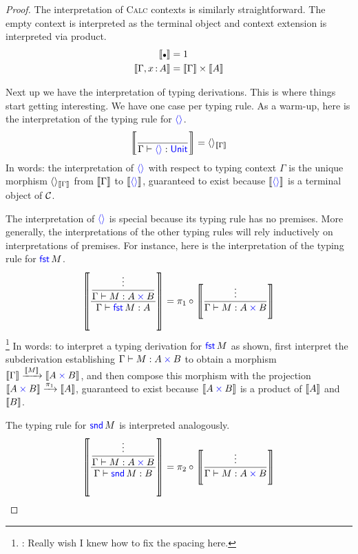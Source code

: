 \begin{proof}
  The interpretation of \textsc{Calc} contexts is similarly straightforward.
  The empty context is interpreted as the terminal object
  and context extension is interpreted via product.
  \begin{align}
    \llbr{\ctxemp} &= 1 \\
    \llbr{\Gamma, x\ofty A} &= \llbr{\Gamma} \times \llbr{A}
  \end{align}

  Next up we have the interpretation of typing derivations.
  This is where things start getting interesting.
  We have one case per typing rule. As a warm-up,
  here is the interpretation of the typing rule for \({{\color{blue}\langle \rangle}}\).
  \begin{align}
    \left\llbracket 
      \frac
        {~}
        {\Gamma \vdash {{\color{blue}\langle \rangle}} : \mathsf{{\color{blue}Unit}}}
    \right\rrbracket
    = \langle \rangle_{\left\llbracket \Gamma\right\rrbracket}
  \end{align}
  In words: the interpretation of \({{\color{blue}\langle \rangle}}\)
  with respect to typing context \(\Gamma\)
  is the unique morphism \(\langle \rangle_{\left\llbracket \Gamma\right\rrbracket}\)
  from \(\left\llbracket \Gamma\right\rrbracket\) to \(\left\llbracket {{\color{blue}\langle \rangle}}\right\rrbracket\),
  guaranteed to exist because \(\left\llbracket {{\color{blue}\langle \rangle}}\right\rrbracket\)
  is a terminal object of \(\mathcal C\).

  The interpretation of \({{\color{blue}\langle \rangle}}\) is special because its typing rule has no premises.
  More generally, the interpretations of the other typing rules
  will rely inductively on interpretations of premises.
  For instance, here is the interpretation of the typing rule for \(\mathsf{{\color{blue}fst}}\,M\).
  \begin{align}
    \left\llbracket 
      \dfrac
        {\displaystyle\frac{\vdots}{{{{\Gamma \vdash M : A \mathbin{{\color{blue}\times}} B}}}}}
        {\Gamma \vdash \mathsf{{\color{blue}fst}}\,M : A}
    \right\rrbracket
    = \pi_1 \circ \left\llbracket \frac{\vdots}{\Gamma \vdash M : A \mathbin{{\color{blue}\times}} B}\right\rrbracket
  \end{align}
  \footnote{\todo: Really wish I knew how to fix the spacing here.}
  In words: to interpret a typing derivation for \(\mathsf{{\color{blue}fst}}\,M\)
  as shown, first interpret the subderivation
  establishing \(\Gamma \vdash M : A \mathbin{{\color{blue}\times}} B\)
  to obtain a morphism \(\left\llbracket \Gamma\right\rrbracket \xrightarrow{\left\llbracket M\right\rrbracket} \left\llbracket A\mathbin{{\color{blue}\times}} B\right\rrbracket\),
  and then compose this morphism with the projection
  \(\left\llbracket A\mathbin{{\color{blue}\times}} B\right\rrbracket \xrightarrow{\pi_1} \left\llbracket A\right\rrbracket\),
  guaranteed to exist because \(\left\llbracket A \mathbin{{\color{blue}\times}} B\right\rrbracket\)
  is a product of \(\left\llbracket A\right\rrbracket\) and \(\left\llbracket B\right\rrbracket\).

  The typing rule for \(\mathsf{{\color{blue}snd}}\,M\) is interpreted analogously.
  \begin{align}
    \left\llbracket 
      \displaystyle\frac
        {\displaystyle\frac{\vdots}{{{{\Gamma \vdash M : A \mathbin{{\color{blue}\times}} B}}}}}
        {\Gamma \vdash \mathsf{{\color{blue}snd}}\,M : B}
    \right\rrbracket
    = \pi_2 \circ \left\llbracket \frac{\vdots}{\Gamma \vdash M : A \mathbin{{\color{blue}\times}} B}\right\rrbracket
  \end{align}


\end{proof}
